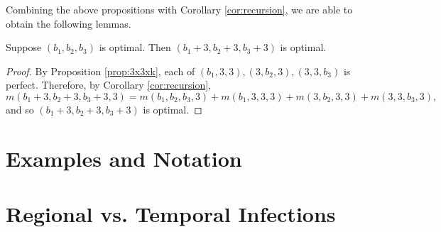 Combining the above propositions with Corollary \ref{cor:recursion}, we are able to obtain the following lemmas.

\begin{lem}
Suppose $(b_1, b_2, b_3)$ is optimal. Then $(b_1+3, b_2+3, b_3+3)$ is optimal. 
\end{lem}

\begin{proof}
By Proposition \ref{prop:3x3xk}, each of $(b_1,3,3), (3,b_2,3),(3,3,b_3)$ is perfect. Therefore, by Corollary \ref{cor:recursion}, 
$$m(b_1+3, b_2+3, b_3+3, 3) = m(b_1,b_2,b_3,3) + m(b_1,3,3,3) + m(3,b_2,3,3) + m(3,3,b_3,3),$$
and so $(b_1+3, b_2+3, b_3+3)$ is optimal.
\end{proof}


\section{Examples and Notation}


\section{Regional vs. Temporal Infections}


